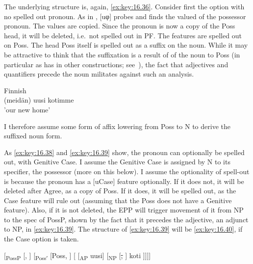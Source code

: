 \documentclass[output=paper]{langsci/langscibook}
\begin{document}
The underlying structure is, again, \eqref{ex:key:16.36}. Consider first the option with no
spelled out pronoun. As in , [uφ] probes and finds the valued 
of the possessor pronoun. The values are copied. Since the pronoun is now a
copy of the Poss head, it will be deleted, i.e.\ not spelled out in PF. The
features are spelled out on Poss. The head Poss itself is spelled out as a
suffix on the noun. While it may be attractive to think that the suffixation is
a result of  of the noun to Poss (in particular as  has
 in other constructions; see~\citealt{HolmbergEtAl1993}), the fact that
adjectives and quantifiers precede the noun militates against such an analysis.

\ea Finnish\\\label{ex:key:16.39}
	(meidän) uusi kotimme\\
	'our new home'\\
\z

I therefore assume some form of affix lowering from Poss to N to derive the
suffixed noun form.

As \eqref{ex:key:16.38} and \eqref{ex:key:16.39} show, the pronoun can optionally be spelled out, with Genitive
Case. I assume the Genitive Case is assigned by N to its specifier, the
possessor (more on this below). I assume the optionality of spell-out is
because the pronoun has a [uCase] feature optionally. If it does not, it will
be deleted after Agree, as a copy of Poss. If it does, it will be spelled out,
as the Case feature will rule out  (assuming that the Poss does
not have a Genitive feature).  Also, if it is not deleted, the \gls{EPP} will trigger
movement of it from NP to the spec of PossP, shown by the fact that it precedes
the adjective, an adjunct to NP, in \eqref{ex:key:16.39}. The structure of \eqref{ex:key:16.39} will be \eqref{ex:key:16.40},
if the Case option is taken.

\ea\label{ex:key:16.40}
    {}[\textsubscript{PossP} [\Fpl{}, \Gen{}] [\textsubscript{Possʹ}
        [Poss, \Fpl{}] [ [\textsubscript{AP} uusi]
        [\textsubscript{NP} [\sout{\Fpl{}, \Gen{}}] koti ]]]]
\z
\end{document}

